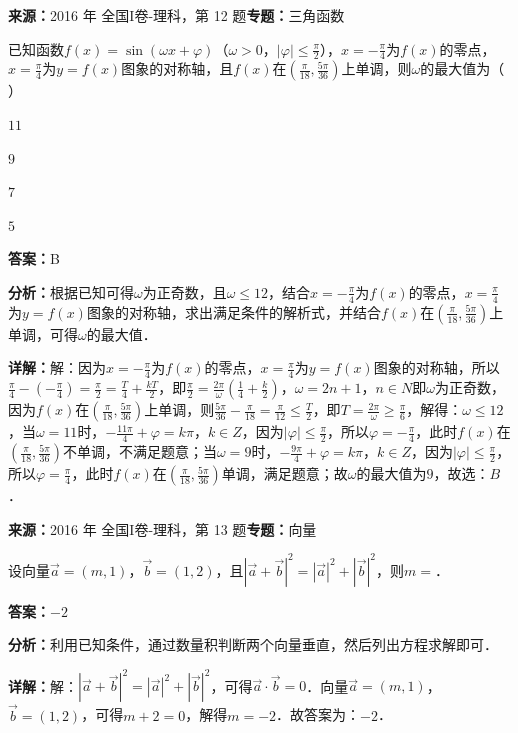 \begin{question}[points=5]
\textbf{来源：}2016 年 全国I卷-理科，第 12 题\quad \textbf{专题：}三角函数\par
已知函数$f(x)=\sin(\omega x+\varphi)$（$\omega>0$，$|\varphi|\le\frac{\pi}{2}$），$x=-\frac{\pi}{4}$为$f(x)$的零点，$x=\frac{\pi}{4}$为$y=f(x)$图象的对称轴，且$f(x)$在$(\frac{\pi}{18},\frac{5\pi}{36})$上单调，则$\omega$的最大值为（ ）
\begin{choices}
  \item $11$
  \item $9$
  \item $7$
  \item $5$
\end{choices}
\begin{solution}
\textbf{答案：}B

\textbf{分析：}根据已知可得$\omega$为正奇数，且$\omega\le12$，结合$x=-\frac{\pi}{4}$为$f(x)$的零点，$x=\frac{\pi}{4}$为$y=f(x)$图象的对称轴，求出满足条件的解析式，并结合$f(x)$在$(\frac{\pi}{18},\frac{5\pi}{36})$上单调，可得$\omega$的最大值．

\textbf{详解：}解：因为$x=-\frac{\pi}{4}$为$f(x)$的零点，$x=\frac{\pi}{4}$为$y=f(x)$图象的对称轴，所以$\frac{\pi}{4}-(-\frac{\pi}{4})=\frac{\pi}{2}=\frac{T}{4}+\frac{kT}{2}$，即$\frac{\pi}{2}=\frac{2\pi}{\omega}(\frac{1}{4}+\frac{k}{2})$，$\omega=2n+1$，$n\in N$即$\omega$为正奇数，因为$f(x)$在$(\frac{\pi}{18},\frac{5\pi}{36})$上单调，则$\frac{5\pi}{36}-\frac{\pi}{18}=\frac{\pi}{12}\le\frac{T}{2}$，即$T=\frac{2\pi}{\omega}\ge\frac{\pi}{6}$，解得：$\omega\le12$，当$\omega=11$时，$-\frac{11\pi}{4}+\varphi=k\pi$，$k\in Z$，因为$|\varphi|\le\frac{\pi}{2}$，所以$\varphi=-\frac{\pi}{4}$，此时$f(x)$在$(\frac{\pi}{18},\frac{5\pi}{36})$不单调，不满足题意；当$\omega=9$时，$-\frac{9\pi}{4}+\varphi=k\pi$，$k\in Z$，因为$|\varphi|\le\frac{\pi}{2}$，所以$\varphi=\frac{\pi}{4}$，此时$f(x)$在$(\frac{\pi}{18},\frac{5\pi}{36})$单调，满足题意；故$\omega$的最大值为$9$，故选：$B$．
\end{solution}
\end{question}

\begin{question}[points=5]
\textbf{来源：}2016 年 全国I卷-理科，第 13 题\quad \textbf{专题：}向量\par
设向量$\vec{a}=(m,1)$，$\vec{b}=(1,2)$，且$|\vec{a}+\vec{b}|^2=|\vec{a}|^2+|\vec{b}|^2$，则$m=$．
\fillin[{$-2$}]
\begin{solution}
\textbf{答案：}$-2$

\textbf{分析：}利用已知条件，通过数量积判断两个向量垂直，然后列出方程求解即可．

\textbf{详解：}解：$|\vec{a}+\vec{b}|^2=|\vec{a}|^2+|\vec{b}|^2$，可得$\vec{a}\cdot\vec{b}=0$．向量$\vec{a}=(m,1)$，$\vec{b}=(1,2)$，可得$m+2=0$，解得$m=-2$．故答案为：$-2$．
\end{solution}
\end{question}

